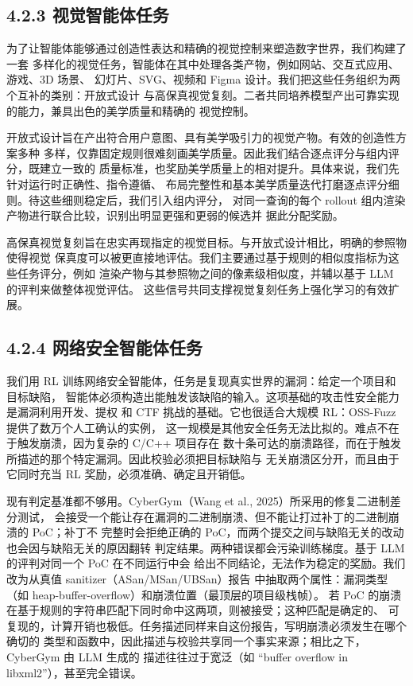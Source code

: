 \subsection{4.2.3 视觉智能体任务}\label{visual-agent-tasks}

为了让智能体能够通过创造性表达和精确的视觉控制来塑造数字世界，我们构建了一套
多样化的视觉任务，智能体在其中处理各类产物，例如网站、交互式应用、游戏、3D 场景、
幻灯片、SVG、视频和 Figma 设计。我们把这些任务组织为两个互补的类别：开放式设计
与高保真视觉复刻。二者共同培养模型产出可靠实现的能力，兼具出色的美学质量和精确的
视觉控制。

开放式设计旨在产出符合用户意图、具有美学吸引力的视觉产物。有效的创造性方案多种
多样，仅靠固定规则很难刻画美学质量。因此我们结合逐点评分与组内评分，既建立一致的
质量标准，也奖励美学质量上的相对提升。具体来说，我们先针对运行时正确性、指令遵循、
布局完整性和基本美学质量迭代打磨逐点评分细则。待这些细则稳定后，我们引入组内评分，
对同一查询的每个 rollout 组内渲染产物进行联合比较，识别出明显更强和更弱的候选并
据此分配奖励。

高保真视觉复刻旨在忠实再现指定的视觉目标。与开放式设计相比，明确的参照物使得视觉
保真度可以被更直接地评估。我们主要通过基于规则的相似度指标为这些任务评分，例如
渲染产物与其参照物之间的像素级相似度，并辅以基于 LLM 的评判来做整体视觉评估。
这些信号共同支撑视觉复刻任务上强化学习的有效扩展。

\subsection{4.2.4 网络安全智能体任务}\label{cybersecurity-agent-tasks}

我们用 RL 训练网络安全智能体，任务是复现真实世界的漏洞：给定一个项目和目标缺陷，
智能体必须构造出能触发该缺陷的输入。这项基础的攻击性安全能力是漏洞利用开发、提权
和 CTF 挑战的基础。它也很适合大规模 RL：OSS-Fuzz 提供了数万个人工确认的实例，
这一规模是其他安全任务无法比拟的。难点不在于触发崩溃，因为复杂的 C/C++ 项目存在
数十条可达的崩溃路径，而在于触发所描述的那个特定漏洞。因此校验必须把目标缺陷与
无关崩溃区分开，而且由于它同时充当 RL 奖励，必须准确、确定且开销低。

现有判定基准都不够用。CyberGym（Wang et al., 2025）所采用的修复二进制差分测试，
会接受一个能让存在漏洞的二进制崩溃、但不能让打过补丁的二进制崩溃的 PoC；补丁不
完整时会拒绝正确的 PoC，而两个提交之间与缺陷无关的改动也会因与缺陷无关的原因翻转
判定结果。两种错误都会污染训练梯度。基于 LLM 的评判对同一个 PoC 在不同运行中会
给出不同结论，无法作为稳定的奖励。我们改为从真值 sanitizer（ASan/MSan/UBSan）报告
中抽取两个属性：漏洞类型（如 heap-buffer-overflow）和崩溃位置（最顶层的项目级栈帧）。
若 PoC 的崩溃在基于规则的字符串匹配下同时命中这两项，则被接受；这种匹配是确定的、
可复现的，计算开销也极低。任务描述同样来自这份报告，写明崩溃必须发生在哪个确切的
类型和函数中，因此描述与校验共享同一个事实来源；相比之下，CyberGym 由 LLM 生成的
描述往往过于宽泛（如 ``buffer overflow in libxml2''），甚至完全错误。


